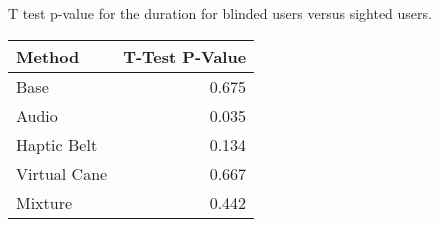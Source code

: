 
\centering
\caption{T test p-value for the duration for blinded users versus sighted users.}
\label{tab:ttest_duration}
\begin{tabular}{lr}
\toprule
      Method &  T-Test P-Value \\
\midrule
        Base &           0.675 \\
       Audio &           0.035 \\
 Haptic Belt &           0.134 \\
Virtual Cane &           0.667 \\
     Mixture &           0.442 \\
\bottomrule
\end{tabular}
